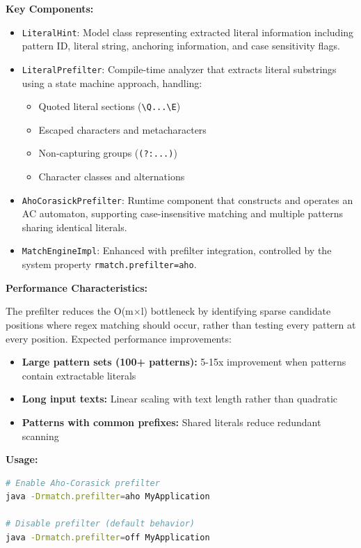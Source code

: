 \documentclass[11pt,a4paper]{article}
\begin{document}
\textbf{Key Components:}

\begin{itemize}
\item \texttt{LiteralHint}: Model class representing extracted literal information including pattern ID, literal string, anchoring information, and case sensitivity flags.

\item \texttt{LiteralPrefilter}: Compile-time analyzer that extracts literal substrings using a state machine approach, handling:
  \begin{itemize}
  \item Quoted literal sections (\texttt{\textbackslash Q...\textbackslash E})
  \item Escaped characters and metacharacters  
  \item Non-capturing groups (\texttt{(?:...)})
  \item Character classes and alternations
  \end{itemize}

\item \texttt{AhoCorasickPrefilter}: Runtime component that constructs and operates an AC automaton, supporting case-insensitive matching and multiple patterns sharing identical literals.

\item \texttt{MatchEngineImpl}: Enhanced with prefilter integration, controlled by the system property \texttt{rmatch.prefilter=aho}.
\end{itemize}

\textbf{Performance Characteristics:}

The prefilter reduces the O(m$\times$l) bottleneck by identifying sparse candidate positions where regex matching should occur, rather than testing every pattern at every position. Expected performance improvements:

\begin{itemize}
\item \textbf{Large pattern sets (100+ patterns):} 5-15x improvement when patterns contain extractable literals
\item \textbf{Long input texts:} Linear scaling with text length rather than quadratic 
\item \textbf{Patterns with common prefixes:} Shared literals reduce redundant scanning
\end{itemize}

\textbf{Usage:}

\begin{lstlisting}[language=bash,caption=Enabling the prefilter]
# Enable Aho-Corasick prefilter
java -Drmatch.prefilter=aho MyApplication

# Disable prefilter (default behavior) 
java -Drmatch.prefilter=off MyApplication
\end{lstlisting}
\end{document}
